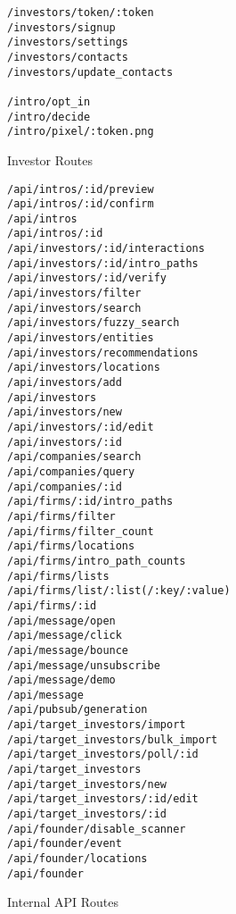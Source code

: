 \begin{figure}[ht]
\begin{multicols}{2}
\begin{verbatim}
/investors/token/:token
/investors/signup
/investors/settings
/investors/contacts
/investors/update_contacts

/intro/opt_in
/intro/decide
/intro/pixel/:token.png
\end{verbatim}
\end{multicols}
\caption{Investor Routes}
\label{vcwiz:routes:investors}
\end{figure}

\begin{figure}[ht]
\begin{multicols}{2}
\begin{verbatim}
/api/intros/:id/preview
/api/intros/:id/confirm
/api/intros
/api/intros/:id
/api/investors/:id/interactions
/api/investors/:id/intro_paths
/api/investors/:id/verify
/api/investors/filter
/api/investors/search
/api/investors/fuzzy_search
/api/investors/entities
/api/investors/recommendations
/api/investors/locations
/api/investors/add
/api/investors
/api/investors/new
/api/investors/:id/edit
/api/investors/:id
/api/companies/search
/api/companies/query
/api/companies/:id
/api/firms/:id/intro_paths
/api/firms/filter
/api/firms/filter_count
/api/firms/locations
/api/firms/intro_path_counts
/api/firms/lists
/api/firms/list/:list(/:key/:value)
/api/firms/:id
/api/message/open
/api/message/click
/api/message/bounce
/api/message/unsubscribe
/api/message/demo
/api/message
/api/pubsub/generation
/api/target_investors/import
/api/target_investors/bulk_import
/api/target_investors/poll/:id
/api/target_investors
/api/target_investors/new
/api/target_investors/:id/edit
/api/target_investors/:id
/api/founder/disable_scanner
/api/founder/event
/api/founder/locations
/api/founder
\end{verbatim}
\end{multicols}
\caption{Internal API Routes}
\label{vcwiz:routes:api}
\end{figure}

\clearpage
\newpage
